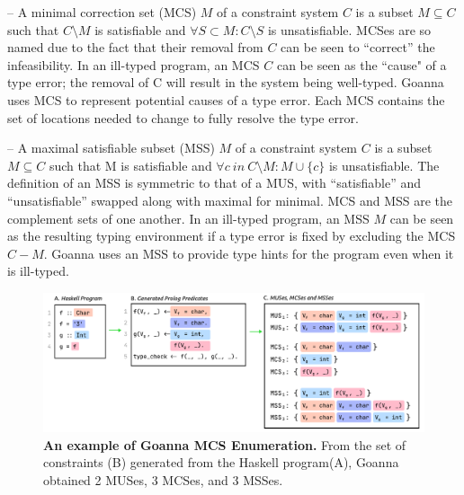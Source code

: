     – A minimal correction set (MCS) $M$ of a constraint system $C$ is a subset $M \subseteq C$ such that $C \setminus M$ is satisfiable and $\forall{S} \subset M : C \setminus S$ is unsatisfiable. MCSes are so named due to the fact that their removal from $C$ can be seen to “correct” the infeasibility. In an ill-typed program, an MCS $C$ can be seen as the ``cause" of a type error; the removal of C will result in the system being well-typed. Goanna uses MCS to represent potential causes of a type error. Each MCS contains the set of locations needed to change to fully resolve the type error.
    
  – A maximal satisfiable subset (MSS) $M$ of a constraint system $C$ is a subset $M \subseteq C$ such that M is satisfiable and $\forall{c}\ in\ C \setminus M:M\cup\{c\}$ is unsatisfiable. The definition of an MSS is symmetric to that of a MUS, with “satisfiable” and “unsatisfiable” swapped along with maximal for minimal. MCS and MSS are the complement sets of one another. In an ill-typed program, an MSS $M$ can be seen as the resulting typing environment if a type error is fixed by excluding the MCS $C - M$. Goanna uses an MSS to provide type hints for the program even when it is ill-typed.
  

 
     \begin{figure}[ht!]
        \centering
        \includegraphics[width=\linewidth]{images/Enumeration-Example}
        \caption[An example of Goanna MCS Enumeration]{\textbf{An example of Goanna MCS Enumeration.} From the set of constraints (B) generated from the Haskell program(A), Goanna obtained 2 MUSes, 3 MCSes, and 3 MSSes. }
        \label{fig:enumeration-example}
    \end{figure}
    
